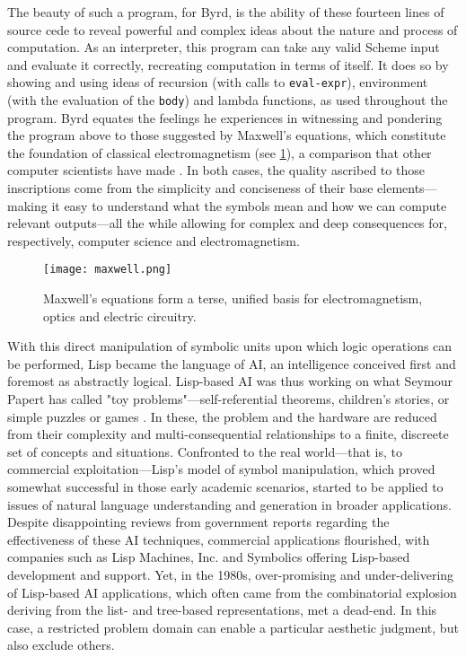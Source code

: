 The beauty of such a program, for Byrd, is the ability of these fourteen lines of source cede to reveal powerful and complex ideas about the nature and process of computation. As an interpreter, this program can take any valid Scheme input and evaluate it correctly, recreating computation in terms of itself. It does so by showing and using ideas of recursion (with calls to \lstinline{eval-expr}), environment (with the evaluation of the \lstinline{body}) and lambda functions, as used throughout the program. Byrd equates the feelings he experiences in witnessing and pondering the program above to those suggested by Maxwell's equations, which constitute the foundation of classical electromagnetism (see \ref{graphic:maxwell-equations}), a comparison that other computer scientists have made \citep{kay_conversation_2004}. In both cases, the quality ascribed to those inscriptions come from the simplicity and conciseness of their base elements—making it easy to understand what the symbols mean and how we can compute relevant outputs—all the while allowing for complex and deep  consequences for, respectively, computer science and electromagnetism.

\begin{figure}
  \texttt{[image: maxwell.png]}
  \caption{Maxwell's equations form a terse, unified basis for electromagnetism, optics and electric circuitry.}
  \label{graphic:maxwell-equations}
\end{figure}

With this direct manipulation of symbolic units upon which logic operations can be performed, Lisp became the language of AI, an intelligence conceived first and foremost as abstractly logical. Lisp-based AI was thus working on what Seymour Papert has called "toy problems"—self-referential theorems, children's stories, or simple puzzles or games \citep{nilsson_early_2009}. In these, the problem and the hardware are reduced from their complexity and multi-consequential relationships to a finite, discreete set of concepts and situations. Confronted to the real world—that is, to commercial exploitation—Lisp's model of symbol manipulation, which proved somewhat successful in those early academic scenarios, started to be applied to issues of natural language understanding and generation in broader applications. Despite disappointing reviews from government reports regarding the effectiveness of these AI techniques, commercial applications flourished, with companies such as Lisp Machines, Inc. and Symbolics offering Lisp-based development and support. Yet, in the 1980s, over-promising and under-delivering of Lisp-based AI applications, which often came from the combinatorial explosion deriving from the list- and tree-based representations, met a dead-end. In this case, a restricted problem domain can enable a particular aesthetic judgment, but also exclude others.

